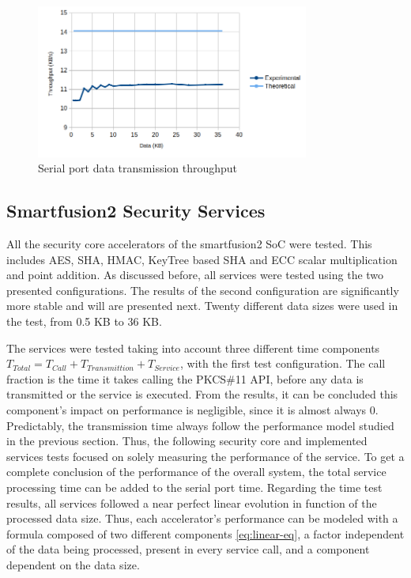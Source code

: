 \begin{figure}[h!]
	\centering
	\includegraphics[width=0.8\textwidth]{./Images/comms-tput.png}
	\caption{Serial port data transmission throughput}
	\label{fig:comms:tput}
\end{figure}

\subsection{Smartfusion2 Security Services}\label{chap:evaluation:board}

All the security core accelerators of the smartfusion2 SoC were tested. This includes \ac{AES}, \ac{SHA}, \ac{HMAC}, KeyTree based \ac{SHA} and \ac{ECC} scalar multiplication and point addition.
As discussed before, all services were tested using the two presented configurations. The results of the second configuration are significantly more stable and will are presented next.
Twenty different data sizes were used in the test, from 0.5 KB to 36 KB.

The services were tested taking into account three different time components \(T_{Total} = T_{Call} + T_{Transmittion} + T_{Service}\), with the first test configuration. The call fraction is the time it takes calling the PKCS\#11 API, before any data is transmitted or the service is executed. From the results, it can be concluded this component's impact on performance is negligible, since it is almost always 0.
Predictably, the transmission time always follow the performance model studied in the previous section.
Thus, the following security core and implemented services tests focused on solely measuring the performance of the service. To get a complete conclusion of the performance of the overall system, the total service processing time can be added to the serial port time.
Regarding the time test results, all services followed a near perfect linear evolution in function of the processed data size. Thus, each accelerator's performance can be modeled with a formula composed of two different components \ref{eq:linear-eq}, a factor independent of the data being processed, present in every service call, and a component dependent on the data size.

